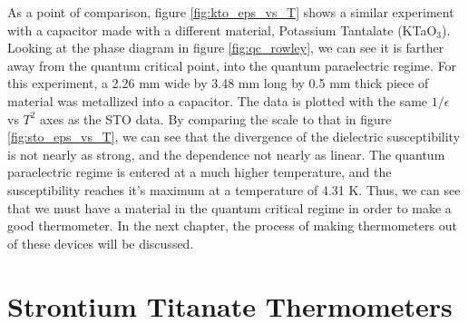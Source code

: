 \documentclass{thesis-umich}
\begin{document}
As a point of comparison, figure \ref{fig:kto_eps_vs_T} shows a similar experiment with a capacitor made with a different material, Potassium Tantalate (KTaO$_3$). Looking at the phase diagram in figure \ref{fig:qc_rowley}, we can see it is farther away from the quantum critical point, into the quantum paraelectric regime. For this experiment, a 2.26 mm wide by 3.48 mm long by 0.5 mm thick piece of material was metallized into a capacitor. The data is plotted with the same $1/\epsilon$ vs $T^2$ axes as the STO data. By comparing the scale to that in figure \ref{fig:sto_eps_vs_T}, we can see that the divergence of the dielectric susceptibility is not nearly as strong, and the dependence not nearly as linear. The quantum paraelectric regime is entered at a much higher temperature, and the susceptibility reaches it's maximum at a temperature of 4.31 K. Thus, we can see that we must have a material in the quantum critical regime in order to make a good thermometer. In the next chapter, the process of making thermometers out of these devices will be discussed. 

\section{Strontium Titanate Thermometers}
\end{document}
